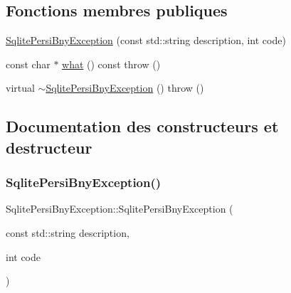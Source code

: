 \subsection*{Fonctions membres publiques}
\begin{DoxyCompactItemize}
\item 
\hyperlink{classSqlitePersiBnyException_a1bbe22eddb62428cc431146e4692406e}{Sqlite\+Persi\+Bny\+Exception} (const std\+::string description, int code)
\item 
const char $\ast$ \hyperlink{classSqlitePersiBnyException_ac1ff5b82a1a2f3ff35b1c90ddc7356d7}{what} () const  throw ()
\item 
virtual \hyperlink{classSqlitePersiBnyException_a06ed1843ac6330bb56476b28322e0836}{$\sim$\+Sqlite\+Persi\+Bny\+Exception} ()  throw ()
\end{DoxyCompactItemize}


\subsection{Documentation des constructeurs et destructeur}
\mbox{\label{classSqlitePersiBnyException_a1bbe22eddb62428cc431146e4692406e}} 
\subsubsection{\texorpdfstring{Sqlite\+Persi\+Bny\+Exception()}{SqlitePersiBnyException()}}
{\footnotesize\ttfamily Sqlite\+Persi\+Bny\+Exception\+::\+Sqlite\+Persi\+Bny\+Exception (\begin{DoxyParamCaption}\item[{const std\+::string}]{description,  }\item[{int}]{code }\end{DoxyParamCaption})\hspace{0.3cm}{\ttfamily [inline]}}

\mbox{\label{classSqlitePersiBnyException_a06ed1843ac6330bb56476b28322e0836}} 
